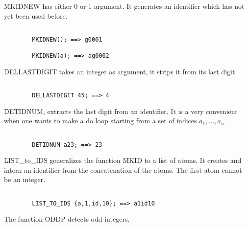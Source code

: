 \f{MKIDNEW} has either 0 or 1 argument. It generates an identifier which
has not yet been used before.
\begin{verbatim}

        MKIDNEW(); ==> g0001

        MKIDNEW(a); ==> ag0002

\end{verbatim}
\f{DELLASTDIGIT} takes an integer as argument, it strips it from its last
digit.
\begin{verbatim}

        DELLASTDIGIT 45; ==> 4

\end{verbatim}
\f{DETIDNUM}, extracts the last digit from an
identifier. It is a very convenient when one wants to make a do loop
starting from a set of indices $ a_1, \ldots , a_{n} $.
\begin{verbatim}

        DETIDNUM a23; ==> 23

\end{verbatim}

\f{LIST\_to\_IDS} generalizes the function \f{MKID} to a list of
atoms. It creates and intern an identifier from the concatenation of
the atoms. The first atom cannot be an integer.
\begin{verbatim}

        LIST_TO_IDS {a,1,id,10}; ==> a1id10

\end{verbatim}
The function \f{ODDP}  detects odd integers.

